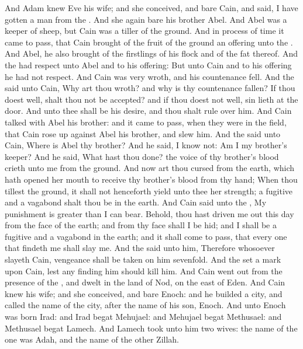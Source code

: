 \begin{biblechapter} %
 And Adam knew Eve his wife; and she conceived, and bare Cain, and said, I have gotten a man from the \LORD.
\verse And she again bare his brother Abel. And Abel was a keeper of sheep, but Cain was a tiller of the ground.
\verse And in process of time it came to pass, that Cain brought of the fruit of the ground an offering unto the \LORD.
\verse And Abel, he also brought of the firstlings of his flock and of the fat thereof. And the \LORD had respect unto Abel and to his offering:
\verse But unto Cain and to his offering he had not respect. And Cain was very wroth, and his countenance fell.
\verse And the \LORD said unto Cain, Why art thou wroth? and why is thy countenance fallen?
\verse If thou doest well, shalt thou not be accepted? and if thou doest not well, sin lieth at the door. And unto thee shall be his desire, and thou shalt rule over him.
\verse And Cain talked with Abel his brother: and it came to pass, when they were in the field, that Cain rose up against Abel his brother, and slew him.
\verse And the \LORD said unto Cain, Where is Abel thy brother? And he said, I know not: Am I my brother's keeper?
\verse And he said, What hast thou done? the voice of thy brother's blood crieth unto me from the ground.
\verse And now art thou cursed from the earth, which hath opened her mouth to receive thy brother's blood from thy hand;
\verse When thou tillest the ground, it shall not henceforth yield unto thee her strength; a fugitive and a vagabond shalt thou be in the earth.
\verse And Cain said unto the \LORD, My punishment is greater than I can bear.
\verse Behold, thou hast driven me out this day from the face of the earth; and from thy face shall I be hid; and I shall be a fugitive and a vagabond in the earth; and it shall come to pass, that every one that findeth me shall slay me.
\verse And the \LORD said unto him, Therefore whosoever slayeth Cain, vengeance shall be taken on him sevenfold. And the \LORD set a mark upon Cain, lest any finding him should kill him.
\verse And Cain went out from the presence of the \LORD, and dwelt in the land of Nod, on the east of Eden.
\verse And Cain knew his wife; and she conceived, and bare Enoch: and he builded a city, and called the name of the city, after the name of his son, Enoch.
\verse And unto Enoch was born Irad: and Irad begat Mehujael: and Mehujael begat Methusael: and Methusael begat Lamech.
\verse And Lamech took unto him two wives: the name of the one was Adah, and the name of the other Zillah.

\end{biblechapter}
